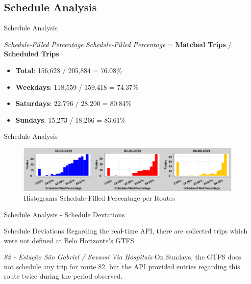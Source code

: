 \documentclass[xcolor=dvipsnames,table]{beamer}
\begin{document}
\subsection{Schedule Analysis}
\begin{frame}{Schedule Analysis}
        \begin{block}{\textit{Schedule-Filled Percentage}}
                \textit{Schedule-Filled Percentage} = \textbf{Matched Trips} / \textbf{Scheduled Trips}
                \begin{itemize}
                        \item \textbf{Total}: 156,628 / 205,884 = 76.08\% 
                        \item \textbf{Weekdays}: 118,559 / 159,418 = 74.37\% 
                        \item \textbf{Saturdays}: 22,796 / 28,200 = 80.84\% 
                        \item \textbf{Sundays}: 15,273 / 18,266 = 83.61\% 
                \end{itemize}
        \end{block}
\end{frame}
\begin{frame}{Schedule Analysis}
        \begin{figure}[H]
                \centering
                \includegraphics[width=\textwidth]{images/histograms.png}
                \caption{Histograms Schedule-Filled Percentage per Routes}
        \end{figure}
\end{frame}
\begin{frame}{Schedule Analysis - Schedule Deviations}
        \begin{block}{Schedule Deviations}
                Regarding the real-time API, there are collected trips which were not defined at Belo Horizonte's GTFS.
        \end{block}
        \begin{block}{\textit{82 - Estação São Gabriel / Savassi Via Hospitais}}
                On Sundays, the GTFS does not schedule any trip for route $82$,
                but the API provided
                entries regarding this route twice during the period observed.
        \end{block}
\end{frame}
\end{document}
